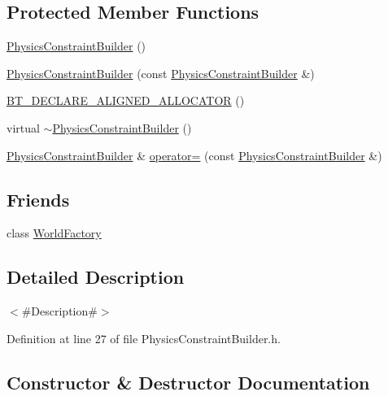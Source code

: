 \subsection*{Protected Member Functions}
\begin{DoxyCompactItemize}
\item 
\mbox{\hyperlink{classnjli_1_1_physics_constraint_builder_ab2f4a2dd4f1a69ee31e83fe8d7b4cde5}{Physics\+Constraint\+Builder}} ()
\item 
\mbox{\hyperlink{classnjli_1_1_physics_constraint_builder_ad5e809bc48fbed105ab1646d28373406}{Physics\+Constraint\+Builder}} (const \mbox{\hyperlink{classnjli_1_1_physics_constraint_builder}{Physics\+Constraint\+Builder}} \&)
\item 
\mbox{\hyperlink{classnjli_1_1_physics_constraint_builder_af62b5d1bcbafb7009285a67a923123f7}{B\+T\+\_\+\+D\+E\+C\+L\+A\+R\+E\+\_\+\+A\+L\+I\+G\+N\+E\+D\+\_\+\+A\+L\+L\+O\+C\+A\+T\+OR}} ()
\item 
virtual \mbox{\hyperlink{classnjli_1_1_physics_constraint_builder_a45d7ca27f704286c7465c80e16d8fc44}{$\sim$\+Physics\+Constraint\+Builder}} ()
\item 
\mbox{\hyperlink{classnjli_1_1_physics_constraint_builder}{Physics\+Constraint\+Builder}} \& \mbox{\hyperlink{classnjli_1_1_physics_constraint_builder_a78e92834a688b68081a11edd48b5641a}{operator=}} (const \mbox{\hyperlink{classnjli_1_1_physics_constraint_builder}{Physics\+Constraint\+Builder}} \&)
\end{DoxyCompactItemize}
\subsection*{Friends}
\begin{DoxyCompactItemize}
\item 
class \mbox{\hyperlink{classnjli_1_1_physics_constraint_builder_acb96ebb09abe8f2a37a915a842babfac}{World\+Factory}}
\end{DoxyCompactItemize}


\subsection{Detailed Description}
$<$\#\+Description\#$>$ 

Definition at line 27 of file Physics\+Constraint\+Builder.\+h.



\subsection{Constructor \& Destructor Documentation}
\mbox{\label{classnjli_1_1_physics_constraint_builder_ab2f4a2dd4f1a69ee31e83fe8d7b4cde5}} 
